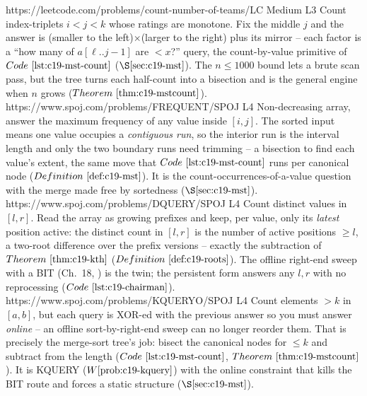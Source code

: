 \begin{mixedset}
    {https://leetcode.com/problems/count-number-of-teams/}{LC Medium L3}
    {Count index-triplets \(i<j<k\) whose ratings are monotone. Fix the middle \(j\) and the
     answer is (smaller to the left)\(\times\)(larger to the right) plus its mirror -- each
     factor is a ``how many of \(a[\ell..j\!-\!1]\) are \(<x\)?'' query, the count-by-value
     primitive of \(\coderef{c19-mst-count}\) (\(\secref{c19-mst}\)). The \(n\le1000\) bound
     lets a brute scan pass, but the tree turns each half-count into a bisection and is the
     general engine when \(n\) grows (\(\thmref{c19-mstcount}\)).}
    {https://www.spoj.com/problems/FREQUENT/}{SPOJ L4}
    {Non-decreasing array, answer the maximum frequency of any value inside \([i,j]\). The
     sorted input means one value occupies a \emph{contiguous run}, so the interior run is the
     interval length and only the two boundary runs need trimming -- a bisection to find each
     value's extent, the same  move that \(\coderef{c19-mst-count}\)
     runs per canonical node (\(\defref{c19-mst}\)). It is the count-occurrences-of-a-value
     question with the merge made free by sortedness (\(\secref{c19-mst}\)).}
    {https://www.spoj.com/problems/DQUERY/}{SPOJ L4}
    {Count distinct values in \([l,r]\). Read the array as growing prefixes and keep, per
     value, only its \emph{latest} position active: the distinct count in \([l,r]\) is the
     number of active positions \(\ge l\), a two-root difference over the prefix versions --
     exactly the subtraction of \(\thmref{c19-kth}\) (\(\defref{c19-roots}\)). The offline
     right-end sweep with a BIT (Ch.~18, ) is the twin; the persistent form answers
     any \(l,r\) with no reprocessing (\(\coderef{c19-chairman}\)).}
    {https://www.spoj.com/problems/KQUERYO/}{SPOJ L4}
    {Count elements \(>k\) in \([a,b]\), but each query is XOR-ed with the previous answer so
     you must answer \emph{online} -- an offline sort-by-right-end sweep can no longer reorder
     them. That is precisely the merge-sort tree's job: bisect the canonical nodes for
     \(\le k\) and subtract from the length (\(\coderef{c19-mst-count}\), \(\thmref{c19-mstcount}\)).
     It is KQUERY (\(\probref{c19-kquery}\)) with the online constraint that kills the BIT
     route and forces a static structure (\(\secref{c19-mst}\)).}

\end{mixedset}
